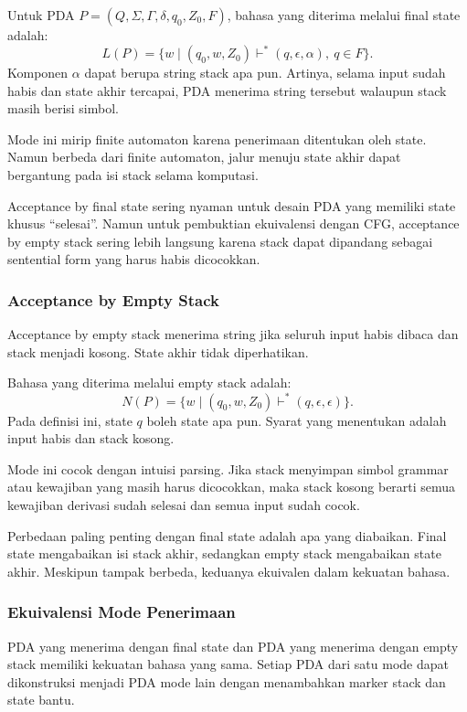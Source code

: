 Untuk PDA $P=(Q,\Sigma,\Gamma,\delta,q_0,Z_0,F)$, bahasa yang diterima melalui final state adalah:
\[
    L(P)=\{w \mid (q_0,w,Z_0)\vdash^*(q,\epsilon,\alpha),\ q\in F\}.
\]
Komponen $\alpha$ dapat berupa string stack apa pun. Artinya, selama input sudah habis dan state akhir tercapai, PDA menerima string tersebut walaupun stack masih berisi simbol.

Mode ini mirip finite automaton karena penerimaan ditentukan oleh state. Namun berbeda dari finite automaton, jalur menuju state akhir dapat bergantung pada isi stack selama komputasi.

Acceptance by final state sering nyaman untuk desain PDA yang memiliki state khusus ``selesai''. Namun untuk pembuktian ekuivalensi dengan CFG, acceptance by empty stack sering lebih langsung karena stack dapat dipandang sebagai sentential form yang harus habis dicocokkan.

\subsubsection{Acceptance by Empty Stack}

\begin{jawab}
Acceptance by empty stack menerima string jika seluruh input habis dibaca dan stack menjadi kosong. State akhir tidak diperhatikan.
\end{jawab}

Bahasa yang diterima melalui empty stack adalah:
\[
    N(P)=\{w \mid (q_0,w,Z_0)\vdash^*(q,\epsilon,\epsilon)\}.
\]
Pada definisi ini, state $q$ boleh state apa pun. Syarat yang menentukan adalah input habis dan stack kosong.

Mode ini cocok dengan intuisi parsing. Jika stack menyimpan simbol grammar atau kewajiban yang masih harus dicocokkan, maka stack kosong berarti semua kewajiban derivasi sudah selesai dan semua input sudah cocok.

Perbedaan paling penting dengan final state adalah apa yang diabaikan. Final state mengabaikan isi stack akhir, sedangkan empty stack mengabaikan state akhir. Meskipun tampak berbeda, keduanya ekuivalen dalam kekuatan bahasa.

\subsubsection{Ekuivalensi Mode Penerimaan}

\begin{jawab}
PDA yang menerima dengan final state dan PDA yang menerima dengan empty stack memiliki kekuatan bahasa yang sama. Setiap PDA dari satu mode dapat dikonstruksi menjadi PDA mode lain dengan menambahkan marker stack dan state bantu.
\end{jawab}

